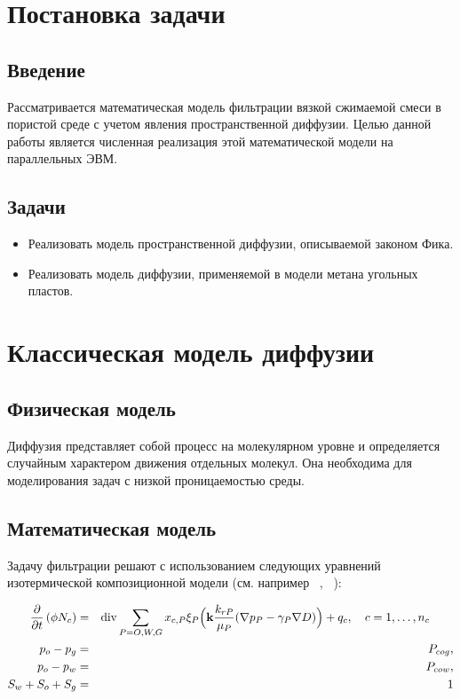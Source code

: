 \documentclass[12pt,a4paper]{article}
\def\Div{\mathop{\rm div}\nolimits}
\begin{document}


\tableofcontents
\newpage
\section{Постановка задачи}
\subsection {Введение}
Рассматривается математическая модель фильтрации вязкой сжимаемой смеси в пористой среде с учетом явления пространственной диффузии. Целью данной работы является численная реализация этой математической модели на параллельных ЭВМ.
\subsection{Задачи}
\begin {itemize}
\item Реализовать модель пространственной диффузии, описываемой законом Фика.
\item Реализовать модель диффузии, применяемой в модели метана угольных пластов.
\end {itemize}

\section{Классическая модель диффузии}

\subsection{Физическая модель}

	Диффузия представляет собой процесс на молекулярном уровне и определяется случайным характером движения отдельных молекул. Она необходима для моделирования задач с низкой проницаемостью среды.

\subsection{Математическая модель}

Задачу фильтрации решают с использованием следующих
 уравнений изотермической композиционной модели (см. например ~\cite{Aziz}, ~\cite{Chen}): 

\label{system_equations}

\begin{eqnarray}
  \label{filtration_1}
  \dfrac{\partial}{\partial t} \left(\phi N_c\right) &=
  & \Div\sum\limits_{P = O, W, G} x_{c,P} \xi_P \Bigl({\bf k} \dfrac{k_{rP}}{\mu_P}(\nabla p_P - \gamma_P \nabla D)\Bigr)+ q_c, \quad c=1,\dots,n_c \qquad \\
  \label{filtration_2}
  p_o - p_g &= &P_{cog}, \\
  \label{filtration_3}
  p_o - p_w &= &P_{cow}, \\
  \label{filtration_4}
  S_w + S_o + S_g &= &1 
\end{eqnarray}
\end{document}
